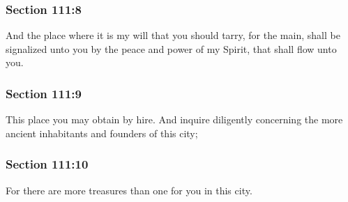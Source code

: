 	\subsubsection{Section 111:8} %
		\label{DC111-8}

		And the place where it is my will that you should tarry, for the main, shall be signalized unto you by the peace and power of my Spirit, that shall flow unto you.


	\subsubsection{Section 111:9} %
		\label{DC111-9}

		This place you may obtain by hire.  And inquire diligently concerning the more ancient inhabitants and founders of this city;


	\subsubsection{Section 111:10} %
		\label{DC111-10}

		For there are more treasures than one for you in this city.


